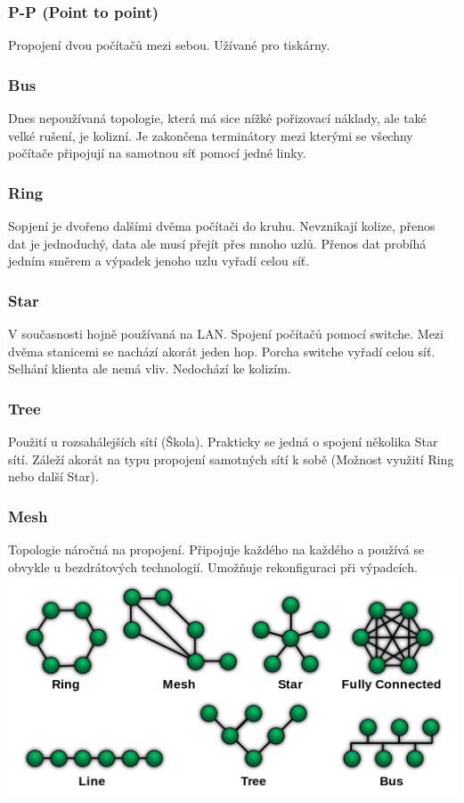 \subsubsection{P-P (Point to point)}
Propojení dvou počítačů mezi sebou. Užívané pro tiskárny.
\subsubsection{Bus}
Dnes nepoužívaná topologie, která má sice nížké pořizovací náklady, ale také velké rušení, je kolizní.
Je zakončena terminátory mezi kterými se všechny počítače připojují na samotnou síť pomocí jedné linky.
\subsubsection{Ring}
Sopjení je dvořeno dalšími dvěma počítači do kruhu.
Nevznikají kolize, přenos dat je jednoduchý, data ale musí přejít přes mnoho uzlů.
Přenos dat probíhá jedním směrem a výpadek jenoho uzlu vyřadí celou síť.
\subsubsection{Star}
V současnosti hojně používaná na LAN.
Spojení počítačů pomocí switche.
Mezi dvěma stanicemi se nachází akorát jeden hop.
Porcha switche vyřadí celou síť.
Selhání klienta ale nemá vliv.
Nedochází ke kolizím.
\subsubsection{Tree}
Použití u rozsahálejších sítí (Škola).
Prakticky se jedná o spojení několika Star sítí.
Záleží akorát na typu propojení samotných sítí k sobě (Možnost využití Ring nebo další Star).
\subsubsection{Mesh}
Topologie náročná na propojení.
Připojuje každého na každého a používá se obvykle u bezdrátových technologií.
Umožňuje rekonfiguraci při výpadcích.\\
\includegraphics[width=\linewidth]{TVY-POS/Rozdeleni-siti/topologie-siti.png}